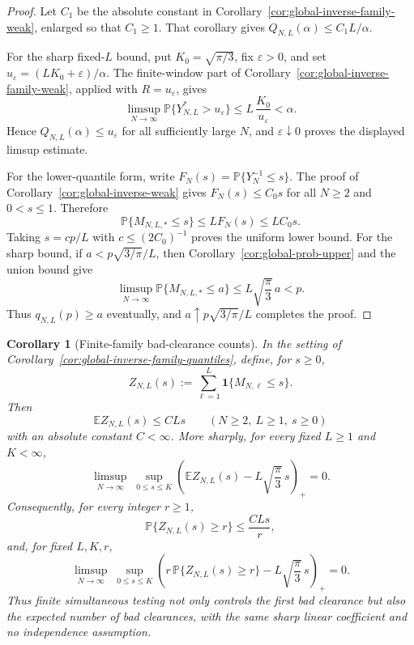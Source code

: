 \documentclass[11pt]{amsart}
\numberwithin{equation}{section}
\newtheorem{corollary}[theorem]{Corollary}
\theoremstyle{definition}
\theoremstyle{remark}
\newcommand{\Prob}{\mathbb P}
\newcommand{\Exp}{\mathbb E}
\newcommand{\eps}{\varepsilon}
\begin{document}
\begin{proof}
Let \(C_1\) be the absolute constant in
Corollary~\ref{cor:global-inverse-family-weak}, enlarged so that \(C_1\ge1\).
That corollary gives \(Q_{N,L}(\alpha)\le C_1L/\alpha\).

For the sharp fixed-\(L\) bound, put \(K_0=\sqrt{\pi/3}\), fix \(\eps>0\), and
set \(u_\eps=(LK_0+\eps)/\alpha\).  The finite-window part of
Corollary~\ref{cor:global-inverse-family-weak}, applied with \(R=u_\eps\), gives
\[
  \limsup_{N\to\infty}\Prob\{Y_{N,L}^*>u_\eps\}
  \le L\,\frac{K_0}{u_\eps}
  <\alpha .
\]
Hence \(Q_{N,L}(\alpha)\le u_\eps\) for all sufficiently large \(N\), and
\(\eps\downarrow0\) proves the displayed limsup estimate.

For the lower-quantile form, write \(F_N(s)=\Prob\{Y_N^{-1}\le s\}\).  The
proof of Corollary~\ref{cor:global-inverse-weak} gives \(F_N(s)\le C_0s\) for
all \(N\ge2\) and \(0<s\le1\).  Therefore
\[
  \Prob\{M_{N,L,*}\le s\}\le L F_N(s)\le LC_0s .
\]
Taking \(s=cp/L\) with \(c\le(2C_0)^{-1}\) proves the uniform lower bound.  For
the sharp bound, if \(a<p\sqrt{3/\pi}/L\), then
Corollary~\ref{cor:global-prob-upper} and the union bound give
\[
  \limsup_{N\to\infty}\Prob\{M_{N,L,*}\le a\}
  \le L\sqrt{\frac{\pi}{3}}\,a
  <p .
\]
Thus \(q_{N,L}(p)\ge a\) eventually, and
\(a\uparrow p\sqrt{3/\pi}/L\) completes the proof.
\end{proof}

\begin{corollary}[Finite-family bad-clearance counts]
\label{cor:global-inverse-family-counts}
In the setting of Corollary~\ref{cor:global-inverse-family-quantiles}, define,
for \(s\ge0\),
\[
  Z_{N,L}(s):=\sum_{\ell=1}^L \mathbf1\{M_{N,\ell}\le s\}.
\]
Then
\[
  \Exp Z_{N,L}(s)\le C Ls
  \qquad(N\ge2,\ L\ge1,\ s\ge0)
\]
with an absolute constant \(C<\infty\).  More sharply, for every fixed
\(L\ge1\) and \(K<\infty\),
\[
  \limsup_{N\to\infty}\;
  \sup_{0\le s\le K}
  \left(
    \Exp Z_{N,L}(s)-L\sqrt{\frac{\pi}{3}}\,s
  \right)_+
  =0 .
\]
Consequently, for every integer \(r\ge1\),
\[
  \Prob\{Z_{N,L}(s)\ge r\}\le \frac{CLs}{r},
\]
and, for fixed \(L,K,r\),
\[
  \limsup_{N\to\infty}\;
  \sup_{0\le s\le K}
  \left(
    r\,\Prob\{Z_{N,L}(s)\ge r\}
    -L\sqrt{\frac{\pi}{3}}\,s
  \right)_+
  =0 .
\]
Thus finite simultaneous testing not only controls the first bad clearance but
also the expected number of bad clearances, with the same sharp linear
coefficient and no independence assumption.
\end{corollary}
\end{document}
